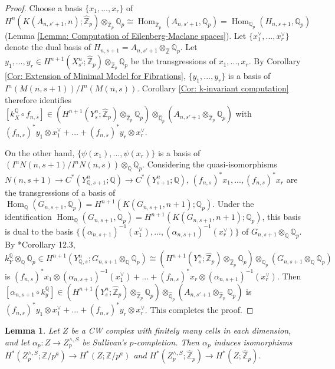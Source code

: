 \documentclass[11pt]{amsart}
\newtheorem{lemma}[theorem]{Lemma}
\theoremstyle{definition}
\numberwithin{equation}{section}
\numberwithin{equation}{section}
\newcommand\QQ{\mathbb{Q}}
\newcommand\ZZ{\mathbb{Z}}
\DeclareMathOperator{\homo}{Hom}
\begin{document}
\begin{proof}
Choose a basis $\{x_1,...,x_r\}$ of $H^{n}(K(A_{n,s'+1},n);\widehat{\ZZ}_p)\otimes_{\widehat{\ZZ}_p} \QQ_p\cong \homo_{\widehat{\ZZ}_p}(A_{n,s'+1},\QQ_p)=\homo_{\QQ_p}(H_{n,s+1},\QQ_p)$ (Lemma \ref{Lemma: Computation of Eilenberg-Maclane spaces}). Let $\{x^{\vee}_1,...,x^{\vee}_r\}$ denote the dual basis of $H_{n,s+1}=A_{n,s'+1}\otimes_{\widehat{\ZZ}}\QQ_p$. Let $y_1,...,y_r\in H^{n+1}(X^n_{s'};\widehat{\ZZ}_p)\otimes_{\widehat{\ZZ}_p} \QQ_p$ be the transgressions of $x_1,...,x_r$. By Corollary \ref{Cor: Extension of Minimal Model for Fibrations}, $\{y_1,...,y_r\}$ is a basis of $I^{n}(M(n,s+1))/I^{n}(M(n,s))$. Corollary \ref{Cor: k-invariant computation} therefore identifies $[k^{\QQ}_X\circ f_{n,s}]\in (H^{n+1}(Y^n_s;\widehat{\ZZ}_p)\otimes_{\widehat{\ZZ}_p} \QQ_p)\otimes_{\widehat{\QQ}_p} (A_{n,s'+1}\otimes_{\widehat{\ZZ}_p} \QQ_p)$ with $(f_{n,s})^*y_1\otimes x^{\vee}_1+... + (f_{n,s})^*y_r\otimes x^{\vee}_r$.

On the other hand, $\{\psi(x_1),...,\psi(x_r)\}$ is a basis of $(I^{n}N(n,s+1)/I^{n}N(n,s))\otimes_{\QQ} \QQ_p$. Considering the quasi-isomorphisms $N(n,s+1)\rightarrow  C^*(Y^n_{\QQ,s+1};\QQ)\rightarrow C^*(Y^n_{s+1};\QQ)$, $(f_{n,s})^*x_1,...,(f_{n,s})^*x_r$ are the transgressions of a basis of $\homo_{\QQ}(G_{n,s+1},\QQ_p)=H^{n+1}(K(G_{n,s+1},n+1);\QQ_p)$. Under the identification $\homo_{\QQ}(G_{n,s+1},\QQ_p)=H^{n+1}(K(G_{n,s+1},n+1);\QQ_p)$, this basis is dual to the basis $\{(\alpha_{n,s+1})^{-1}(x^{\vee}_1),...,(\alpha_{n,s+1})^{-1}(x^{\vee}_r)\}$ of $G_{n,s+1}\otimes_{\QQ} \QQ_p$. By \cite{MGriffiths-Morgan-rational-homotopy}*{Corollary 12.3}, $k^{\QQ}_Y\otimes_{\QQ} \QQ_p\in H^{n+1}(Y^n_{\QQ,s};G_{n,s+1}\otimes_{\QQ} \QQ_p)\cong (H^{n+1}(Y^n_{s};\widehat{\ZZ}_p)\otimes_{\widehat{\ZZ}_p} \QQ_p)\otimes_{\QQ_p} (G_{n,s+1}\otimes_{\QQ} \QQ_p)$ is $(f_{n,s})^*x_1\otimes (\alpha_{n,s+1})^{-1}(x^{\vee}_1)+...+ (f_{n,s})^*x_r\otimes (\alpha_{n,s+1})^{-1}(x^{\vee}_r)$. Then $[\alpha_{n,s+1}\circ k^{\QQ}_y]\in (H^{n+1}(Y^n_s;\widehat{\ZZ}_p)\otimes_{\widehat{\ZZ}_p} \QQ_p)\otimes_{\widehat{\QQ}_p} (A_{n,s'+1}\otimes_{\widehat{\ZZ}_p} \QQ_p)$ is $(f_{n,s})^*y_1\otimes x^{\vee}_1+... + (f_{n,s})^*y_r\otimes x^{\vee}_r$. This completes the proof.
\end{proof}

\begin{lemma}\label{Lem: sullivan's p-adic completion of finite CW complex is good}
Let $Z$ be a CW complex with finitely many cells in each dimension, and let $\alpha_p:Z\rightarrow Z^{\wedge,S}_{p}$ be Sullivan's $p$-completion. Then $\alpha_p$ induces isomorphisms $H^*(Z^{\wedge,S}_{p};\ZZ/p^a)\rightarrow H^*(Z;\ZZ/p^a)$ and $H^*(Z^{\wedge,S}_{p};\widehat{\ZZ}_p)\rightarrow H^*(Z;\widehat{\ZZ}_p)$.
\end{lemma}
\end{document}
